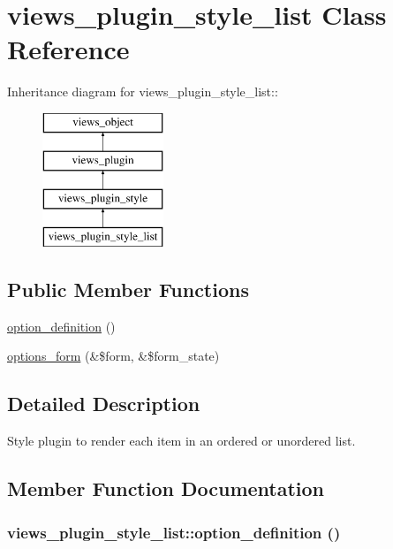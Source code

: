 \hypertarget{classviews__plugin__style__list}{
\section{views\_\-plugin\_\-style\_\-list Class Reference}
\label{classviews__plugin__style__list}
}
Inheritance diagram for views\_\-plugin\_\-style\_\-list::\begin{figure}[H]
\begin{center}
\leavevmode
\includegraphics[height=4cm]{classviews__plugin__style__list}
\end{center}
\end{figure}
\subsection*{Public Member Functions}
\begin{CompactItemize}
\item 
\hyperlink{classviews__plugin__style__list_a95419c3a9f3a6db10f6c6858e5c5bd1}{option\_\-definition} ()
\item 
\hyperlink{classviews__plugin__style__list_37ec2449bb2119e4a8c3730cd458ecdb}{options\_\-form} (\&\$form, \&\$form\_\-state)
\end{CompactItemize}


\subsection{Detailed Description}
Style plugin to render each item in an ordered or unordered list. 

\subsection{Member Function Documentation}
\hypertarget{classviews__plugin__style__list_a95419c3a9f3a6db10f6c6858e5c5bd1}{
\subsubsection[{option\_\-definition}]{\setlength{\rightskip}{0pt plus 5cm}views\_\-plugin\_\-style\_\-list::option\_\-definition ()}}
\label{classviews__plugin__style__list_a95419c3a9f3a6db10f6c6858e5c5bd1}


